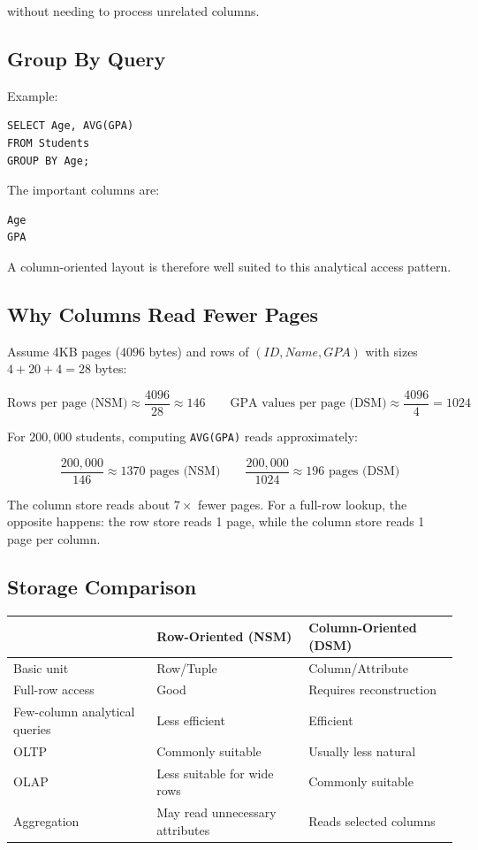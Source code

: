 \documentclass[12pt,a4paper]{article}
\begin{document}
without needing to process unrelated columns.

\subsection{Group By Query}

Example:

\begin{verbatim}
SELECT Age, AVG(GPA)
FROM Students
GROUP BY Age;
\end{verbatim}

The important columns are:

\begin{verbatim}
Age
GPA
\end{verbatim}

A column-oriented layout is therefore well suited to this analytical access pattern.

\subsection{Why Columns Read Fewer Pages}

Assume 4KB pages ($4096$ bytes) and rows of $(ID, Name, GPA)$ with sizes $4 + 20 + 4 = 28$ bytes:

\[
\text{Rows per page (NSM)} \approx \frac{4096}{28} \approx 146
\qquad
\text{GPA values per page (DSM)} \approx \frac{4096}{4} = 1024
\]

For $200{,}000$ students, computing \texttt{AVG(GPA)} reads approximately:

\[
\frac{200{,}000}{146} \approx 1370 \text{ pages (NSM)}
\qquad
\frac{200{,}000}{1024} \approx 196 \text{ pages (DSM)}
\]

The column store reads about $7\times$ fewer pages. For a full-row lookup, the opposite happens: the row store reads 1 page, while the column store reads 1 page per column.

\subsection{Storage Comparison}

\begin{center}
\begin{tabular}{p{}|p{}|p{}}
\toprule
 & Row-Oriented (NSM) & Column-Oriented (DSM) \\
\midrule
Basic unit & Row/Tuple & Column/Attribute \\
Full-row access & Good & Requires reconstruction \\
Few-column analytical queries & Less efficient & Efficient \\
OLTP & Commonly suitable & Usually less natural \\
OLAP & Less suitable for wide rows & Commonly suitable \\
Aggregation & May read unnecessary attributes & Reads selected columns \\
\bottomrule
\end{tabular}
\end{center}
\end{document}
